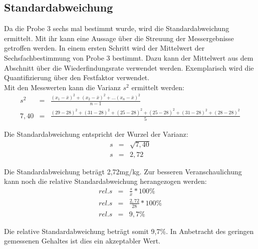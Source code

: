 \subsection{Standardabweichung}
Da die Probe 3 sechs mal bestimmt wurde, wird die Standardabweichung ermittelt. Mit ihr kann eine Aussage über die Streuung der Messergebnisse getroffen werden. In einem ersten Schritt wird der Mittelwert der Sechsfachbestimmung von Probe 3 bestimmt. Dazu kann der Mittelwert aus dem Abschnitt über die Wiederfindungsrate verwendet werden. Exemplarisch wird die Quantifizierung über den Festfaktor verwendet.\\
Mit den Messwerten kann die Varianz $s^{ 2 }$ ermittelt werden:
\begin{eqnarray*}
    s^{ 2 }&=&\frac{ (x_{ 1 }-\bar{x})^{ 2 }+(x_{ 2 }-\bar{x})^{ 2 }+...(x_{ n }-\bar{x})^{ 2 } }{ n-1 }\\
    7,40&=&\frac{ (29-28)^{ 2 }+(31-28)^{ 2 }+(25-28)^{ 2 }+(25-28)^{ 2 }+(31-28)^{ 2 }+(28-28)^{ 2 } }{ 5 }
\end{eqnarray*}

Die Standardabweichung entspricht der Wurzel der Varianz:
\begin{eqnarray*}
    s&=&\sqrt{ 7,40 }\\
    s&=&2,72
\end{eqnarray*}

Die Standardabweichung beträgt 2,72mg/kg. Zur besseren Veranschaulichung kann noch die relative Standardabweichung herangezogen werden:
\begin{eqnarray*}
    rel.s&=&\frac{ s }{ \bar{x} }*100\%\\
    rel.s&=&\frac{ 2,72 }{ 28 }*100\%\\
    rel.s&=&9,7\%
\end{eqnarray*}

Die relative Standardabweichung beträgt somit 9,7\%. In Anbetracht des geringen gemessenen Gehaltes ist dies ein akzeptabler Wert.

